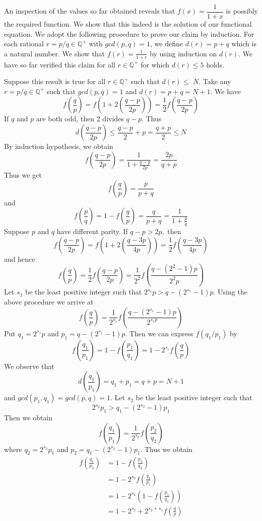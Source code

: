 \documentclass[12pt]{article}
\begin{document}
An inspection of the values so far obtained reveals that $f(x)=\dfrac{1}{1+x}$ is possibly the required function. We show that this indeed is the solution of our functional equation. We adopt the following procedure to prove our claim by induction. For each rational $r=p / q \in \mathbb{Q}^{+}$ with $gcd(p, q)= 1$, we define $d(r)=p+q$ which is a natural number. We show that $f(r)=\frac{1}{1+r}$ by using induction on $d(r)$. We have so far verified this claim for all $r \in \mathbb{Q}^{+}$ for which $d(r) \leq 5$ holds.

Suppose this result is true for all $r \in \mathbb{Q}^{+}$ such that $d(r) \leq$
$N .$ Take any $r=p / q \in \mathbb{Q}^{+}$ such that $gcd(p, q)=1$ and $d(r)=p+q=N+1 .$ We have
$$
f\left(\frac{q}{p}\right)=f\left(1+2\left(\frac{q-p}{2 p}\right)\right)=\frac{1}{2} f\left(\frac{q-p}{2 p}\right)
$$If $q$ and $p$ are both odd, then 2 divides $q-p .$ Thus
$$
d\left(\frac{q-p}{2 p}\right) \leq \frac{q-p}{2}+p=\frac{q+p}{2} \leq N
$$
By induction hypothesis, we obtain
$$
f\left(\frac{q-p}{2 p}\right)=\frac{1}{1+\frac{q-p}{2 p}}=\frac{2 p}{q+p}
$$
Thus we get
$$
f\left(\frac{q}{p}\right)=\frac{p}{p+q}
$$
and
$$
f\left(\frac{p}{q}\right)=1-f\left(\frac{q}{p}\right)=\frac{q}{p+q}=\frac{1}{1+\frac{p}{q}}
$$
Suppose $p$ and $q$ have different parity. If $q-p>2 p,$ then
$$
f\left(\frac{q-p}{2 p}\right)=f\left(1+2\left(\frac{q-3 p}{4 p}\right)\right)=\frac{1}{2} f\left(\frac{q-3 p}{4 p}\right)
$$
and hence
$$
f\left(\frac{q}{p}\right)=\frac{1}{2} f\left(\frac{q-p}{2 p}\right)=\frac{1}{2^{2}} f\left(\frac{q-\left(2^{2}-1\right) p}{2^{2} p}\right)
$$
Let $s_{1}$ be the least positive integer such that $2^{s_{1}} p>q-\left(2^{s_{1}}-1\right) p .$ Using the above procedure we arrive at
$$
f\left(\frac{q}{p}\right)=\frac{1}{2^{s_{1}}} f\left(\frac{q-\left(2^{s_{1}}-1\right) p}{2^{s_{1} p}}\right)
$$
Put $q_{1}=2^{s_{1}} p$ and $p_{1}=q-\left(2^{s_{1}}-1\right) p .$ Then we can express $f\left(q_{1} / p_{1}\right)$ by
$$
f\left(\frac{q_{1}}{p_{1}}\right)=1-f\left(\frac{p_{1}}{q_{1}}\right)=1-2^{s_{1}} f\left(\frac{q}{p}\right)
$$We observe that
$$
d\left(\frac{q_{1}}{p_{1}}\right)=q_{1}+p_{1}=q+p=N+1
$$
and $gcd\left(p_{1}, q_{1}\right)=gcd(p, q)=1 .$ Let $s_{2}$ be the least positive integer such that
$$
2^{s_{2}} p_{1}>q_{1}-\left(2^{s_{2}}-1\right) p_{1}
$$
Then we obtain
$$
f\left(\frac{q_{1}}{p_{1}}\right)=\frac{1}{2^{s_{2}}} f\left(\frac{p_{2}}{q_{2}}\right)
$$
where $q_{2}=2^{s_{2}} p_{1}$ and $p_{2}=q_{1}-\left(2^{s_{2}}-1\right) p_{1} .$ Thus we obtain
$$
\begin{aligned}
f\left(\frac{q_{2}}{p_{2}}\right) &=1-f\left(\frac{p_{2}}{q_{2}}\right) \\
&=1-2^{s_{2}} f\left(\frac{q_{1}}{p_{1}}\right) \\
&=1-2^{s_{2}}\left(1-f\left(\frac{p_{1}}{q_{1}}\right)\right) \\
&=1-2^{s_{2}}+2^{s_{2}+s_{1}} f\left(\frac{q}{p}\right)
\end{aligned}
$$
\end{document}
